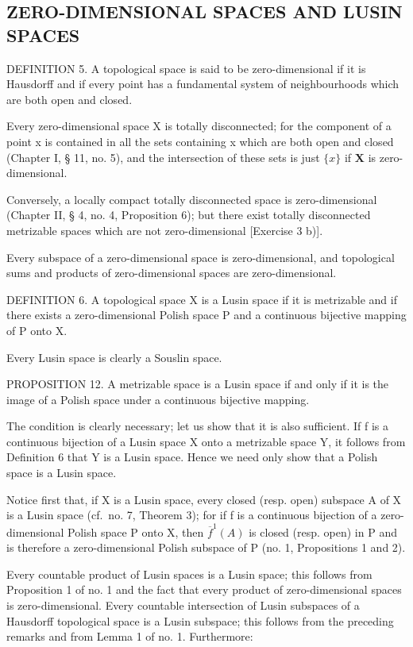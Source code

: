 \subsection{ZERO-DIMENSIONAL SPACES AND LUSIN SPACES}

DEFINITION 5. A topological space is said to be zero-dimensional if it is Hausdorff and if every point has a fundamental system of neighbourhoods which are both open and closed.

Every zero-dimensional space X is totally disconnected; for the component of a point x is contained in all the sets containing x which are both open and closed (Chapter I, § 11, no. 5), and the intersection of these sets is just \(\{x\}\) if \(\mathbf{X}\) is zero-dimensional.

Conversely, a locally compact totally disconnected space is zero-dimensional (Chapter II, § 4, no. 4, Proposition 6); but there exist totally disconnected metrizable spaces which are not zero-dimensional {[}Exercise 3 b){]}.

Every subspace of a zero-dimensional space is zero-dimensional, and topological sums and products of zero-dimensional spaces are zero-dimensional.

DEFINITION 6. A topological space X is a Lusin space if it is metrizable and if there exists a zero-dimensional Polish space P and a continuous bijective mapping of P onto X.

Every Lusin space is clearly a Souslin space.

PROPOSITION 12. A metrizable space is a Lusin space if and only if it is the image of a Polish space under a continuous bijective mapping.

The condition is clearly necessary; let us show that it is also sufficient. If f is a continuous bijection of a Lusin space X onto a metrizable space Y, it follows from Definition 6 that Y is a Lusin space. Hence we need only show that a Polish space is a Lusin space.

Notice first that, if X is a Lusin space, every closed (resp. open) subspace A of X is a Lusin space (cf.~no. 7, Theorem 3); for if f is a continuous bijection of a zero-dimensional Polish space P onto X, then \(\overline{f}^{1}(A)\) is closed (resp. open) in P and is therefore a zero-dimensional Polish subspace of P (no. 1, Propositions 1 and 2).

Every countable product of Lusin spaces is a Lusin space; this follows from Proposition 1 of no. 1 and the fact that every product of zero-dimensional spaces is zero-dimensional. Every countable intersection of Lusin subspaces of a Hausdorff topological space is a Lusin subspace; this follows from the preceding remarks and from Lemma 1 of no. 1. Furthermore:

